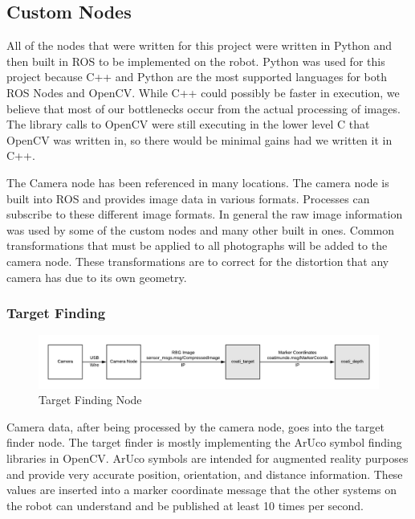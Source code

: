 \documentclass{article}[12]
\begin{document}
	\subsection{Custom Nodes}
	
 All of the nodes that were written for this project were written in Python and then built in ROS to be implemented on the robot. Python was used for this project because C++ and Python are the most supported languages for both ROS Nodes and OpenCV. While C++ could possibly be faster in execution, we believe that most of our bottlenecks occur from the actual processing of images. The library calls to OpenCV were still executing in the lower level C that OpenCV was written in, so there would be minimal gains had we written it in C++.
 
 The Camera node has been referenced in many locations. The camera node is built into ROS and provides image data in various formats. Processes can subscribe to these different image formats. In general the raw image information was used by some of the custom nodes and many other built in ones. Common transformations that must be applied to all photographs will be added to the camera node. These transformations are to correct for the distortion that any camera has due to its own geometry.
	
	\subsubsection{Target Finding}
	
	\begin{figure}[H]
		\centering
		\includegraphics[width=0.9\linewidth]{TargetDiagram.png}
		\caption{Target Finding Node}
		\label{fig:target}
	\end{figure}

	Camera data, after being processed by the camera node, goes into the target finder node. The target finder is mostly implementing the ArUco symbol finding libraries in OpenCV. ArUco symbols are intended for augmented reality purposes and provide very accurate position, orientation, and distance information. These values are inserted into a marker coordinate message that the other systems on the robot can understand and be published at least 10 times per second.
	
\end{document}
